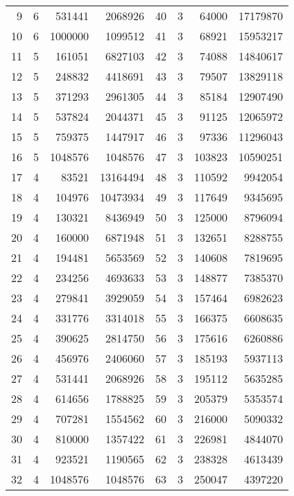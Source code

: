 \documentclass[a4paper,10pt]{article}
\theoremstyle{plain} %
\theoremstyle{definition}
\theoremstyle{remark}
\begin{document}
\begin{center}
\begin{longtable}{r r r r | r r r r}
9  & 6  & 531441  & 2068926  &  40 & 3  & 64000   & 17179870 \\
10 & 6  & 1000000 & 1099512  &  41 & 3  & 68921   & 15953217 \\
11 & 5  & 161051  & 6827103  &  42 & 3  & 74088   & 14840617 \\
12 & 5  & 248832  & 4418691  &  43 & 3  & 79507   & 13829118 \\
13 & 5  & 371293  & 2961305  &  44 & 3  & 85184   & 12907490 \\
14 & 5  & 537824  & 2044371  &  45 & 3  & 91125   & 12065972 \\
15 & 5  & 759375  & 1447917  &  46 & 3  & 97336   & 11296043 \\
16 & 5  & 1048576 & 1048576  &  47 & 3  & 103823  & 10590251 \\
17 & 4  & 83521   & 13164494 &  48 & 3  & 110592  & 9942054  \\
18 & 4  & 104976  & 10473934 &  49 & 3  & 117649  & 9345695  \\
19 & 4  & 130321  & 8436949  &  50 & 3  & 125000  & 8796094  \\
20 & 4  & 160000  & 6871948  &  51 & 3  & 132651  & 8288755  \\
21 & 4  & 194481  & 5653569  &  52 & 3  & 140608  & 7819695  \\
22 & 4  & 234256  & 4693633  &  53 & 3  & 148877  & 7385370  \\
23 & 4  & 279841  & 3929059  &  54 & 3  & 157464  & 6982623  \\
24 & 4  & 331776  & 3314018  &  55 & 3  & 166375  & 6608635  \\
25 & 4  & 390625  & 2814750  &  56 & 3  & 175616  & 6260886  \\
26 & 4  & 456976  & 2406060  &  57 & 3  & 185193  & 5937113  \\
27 & 4  & 531441  & 2068926  &  58 & 3  & 195112  & 5635285  \\
28 & 4  & 614656  & 1788825  &  59 & 3  & 205379  & 5353574  \\
29 & 4  & 707281  & 1554562  &  60 & 3  & 216000  & 5090332  \\
30 & 4  & 810000  & 1357422  &  61 & 3  & 226981  & 4844070  \\
31 & 4  & 923521  & 1190565  &  62 & 3  & 238328  & 4613439  \\
32 & 4  & 1048576 & 1048576  &  63 & 3  & 250047  & 4397220

\end{longtable}
\label{tab:startvaluesn}
\end{center}
\end{document}
